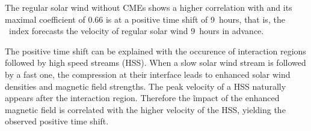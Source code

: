 % 
The regular solar wind without CMEs shows a higher correlation with \Kp{} and its maximal coefficient of 0.66 is at a positive time shift of 9~hours, that is, the \Kp~index forecasts the velocity of regular solar wind 9~hours in advance.

The positive time shift can be explained with the occurence of interaction regions followed by high speed streams (HSS). When a slow solar wind stream is followed by a fast one, the compression at their interface leads to enhanced solar wind densities and magnetic field strengths. The peak velocity of a HSS naturally appears after the interaction region. Therefore the \Kp\~impact of the enhanced magnetic field is correlated with the higher velocity of the HSS, yielding the observed positive time shift.\\


